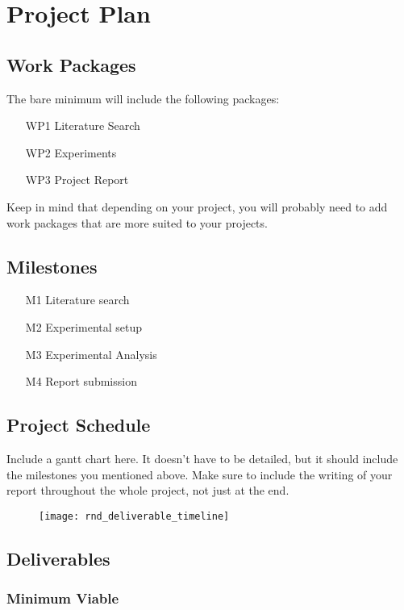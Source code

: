 \documentclass[thesis]{mas_proposal}
\begin{document}
\chapter{Project Plan}

\section{Work Packages}
The bare minimum will include the following packages:
\begin{enumerate}
    \item[WP1] Literature Search
    \item[WP2] Experiments
    \item[WP3] Project Report
\end{enumerate}
Keep in mind that depending on your project, you will probably need to add work packages that are more suited to your projects.

\section{Milestones}
\begin{enumerate}
    \item[M1] Literature search
    \item[M2] Experimental setup
    \item[M3] Experimental Analysis
    \item[M4] Report submission
\end{enumerate}

\section{Project Schedule}
Include a gantt chart here. It doesn't have to be detailed, but it should include the milestones you mentioned above.
Make sure to include the writing of your report throughout the whole project, not just at the end.

\begin{figure}[h!]
    \texttt{[image: rnd\_deliverable\_timeline]}
    \caption{}
    \label{}
\end{figure}

\section{Deliverables}
\subsection{Minimum Viable}
\end{document}
